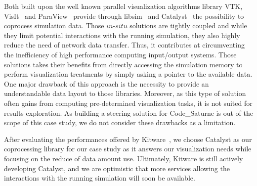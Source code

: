 Both built upon the well known parallel visualization algorithms
library VTK, VisIt~\cite{1532795} and ParaView~\cite{964413} provide through
libsim~\cite{2386230} and Catalyst~\cite{6092322} the possibility to coprocess
simulation data.  Those $in$-$situ$ solutions are tightly coupled and while they
limit potential interactions with the running simulation, they also highly
reduce the need of network data transfer. Thus, it contributes at circumventing
the inefficiency of high performance computing input/output systems.
Those solutions takes their benefits from directly accessing the simulation memory to
perform visualization treatments by simply asking a pointer to the available
data. One major drawback of this approach is the necessity to provide an
understandable data layout to those libraries. Moreover, as this type of
solution often gains from computing pre-determined visualization tasks, it is
not suited for results exploration.  As building a steering solution for Code\_Saturne is out of
the scope of this case study, we do not consider these drawbacks as a limitation. 

After evaluating the performances offered by Kitware~\cite{6092322}, we choose Catalyst as our coprocessing library for our 
case study as it answers our visualization needs while focusing on the 
reduce of data amount use. Ultimately, Kitware is still actively developing 
Catalyst, and we are optimistic that more services allowing the interactions
with the running simulation will soon be available.

